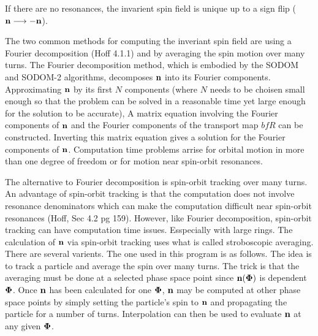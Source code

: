 \documentclass{hitec}
\newcommand{\Bf}[1]{{\bf #1}}
\newcommand{\bfn}{{\Bf n}}
\newcommand{\bfPhi}{{\Bf \Phi}}
\begin{document}
If there are no resonances, the invarient spin field is unique up to a sign flip ($\bfn
\longrightarrow -\bfn$).

The two common methods for computing the inveriant spin field are using a Fourier decomposition
(Hoff 4.1.1) and by averaging the spin motion over many turns. The Fourier decomposition method,
which is embodied by the SODOM and SODOM-2 algorithms, decomposes $\bfn$ into its Fourier
components. Approximating $\bfn$ by its first $N$ components (where $N$ needs to be choisen small
enough so that the problem can be solved in a reasonable time yet large enough for the solution to
be accurate), A matrix equation involving the Fourier components of $\bfn$ and the Fourier
components of the transport map $bfR$ can be constructed. Inverting this matrix equation gives a
solution for the Fourier components of $\bfn$. Computation time problems arrise for orbital motion
in more than one degree of freedom or for motion near spin-orbit resonances.

The alternative to Fourier decomposition is spin-orbit tracking over many turns. An advantage of
spin-orbit tracking is that the computation does not involve resonance denominators which can make
the computation difficult near spin-orbit resonances (Hoff, Sec 4.2 pg 159). However, like Fourier
decomposition, spin-orbit tracking can have computation time issues. Esspecially with large
rings. The calculation of $\bfn$ via spin-orbit tracking uses what is called stroboscopic averaging.
There are several varients. The one used in this program is as follows. The idea is to track a
particle and average the spin over many turns. The trick is that the averaging must be done at a
selected phase space point since $\bfn(\bfPhi)$ is dependent $\bfPhi$. Once $\bfn$ has been
calculated for one $\bfPhi$, $\bfn$ may be computed at other phase space points by simply setting
the particle's spin to $\bfn$ and propagating the particle for a number of turns. Interpolation can
then be used to evaluate $\bfn$ at any given $\bfPhi$.
\end{document}
